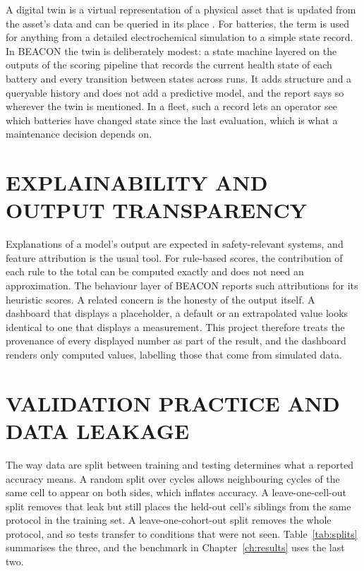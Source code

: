 \documentclass[12pt,a4paper]{amritareport}
\begin{document}
A digital twin is a virtual representation of a physical asset that is updated from the asset's data and can be queried in its place \cite{grieves2014}. For batteries, the term is used for anything from a detailed electrochemical simulation to a simple state record. In BEACON the twin is deliberately modest: a state machine layered on the outputs of the scoring pipeline that records the current health state of each battery and every transition between states across runs. It adds structure and a queryable history and does not add a predictive model, and the report says so wherever the twin is mentioned. In a fleet, such a record lets an operator see which batteries have changed state since the last evaluation, which is what a maintenance decision depends on.

\section{EXPLAINABILITY AND OUTPUT TRANSPARENCY}

Explanations of a model's output are expected in safety-relevant systems, and feature attribution is the usual tool. For rule-based scores, the contribution of each rule to the total can be computed exactly and does not need an approximation. The behaviour layer of BEACON reports such attributions for its heuristic scores. A related concern is the honesty of the output itself. A dashboard that displays a placeholder, a default or an extrapolated value looks identical to one that displays a measurement. This project therefore treats the provenance of every displayed number as part of the result, and the dashboard renders only computed values, labelling those that come from simulated data.

\section{VALIDATION PRACTICE AND DATA LEAKAGE}

The way data are split between training and testing determines what a reported accuracy means. A random split over cycles allows neighbouring cycles of the same cell to appear on both sides, which inflates accuracy. A leave-one-cell-out split removes that leak but still places the held-out cell's siblings from the same protocol in the training set. A leave-one-cohort-out split removes the whole protocol, and so tests transfer to conditions that were not seen. Table~\ref{tab:splits} summarises the three, and the benchmark in Chapter~\ref{ch:results} uses the last two.
\end{document}

